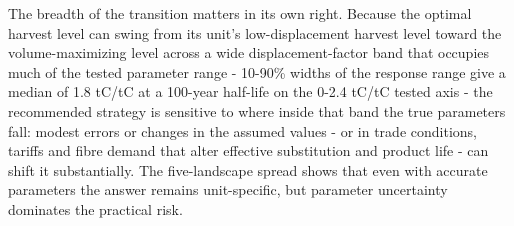 \documentclass[preprint,12pt,authoryear]{elsarticle}
\begin{document}
\begin{linenumbers}
The breadth of the transition matters in its own right. Because the optimal harvest level can swing from its unit's low-displacement harvest level toward the volume-maximizing level across a wide displacement-factor band that occupies much of the tested parameter range - 10-90\% widths of the response range give a median of 1.8 tC/tC at a 100-year half-life on the 0-2.4 tC/tC tested axis - the recommended strategy is sensitive to where inside that band the true parameters fall: modest errors or changes in the assumed values - or in trade conditions, tariffs and fibre demand that alter effective substitution and product life - can shift it substantially. The five-landscape spread shows that even with accurate parameters the answer remains unit-specific, but parameter uncertainty dominates the practical risk.




\end{linenumbers}
\end{document}
